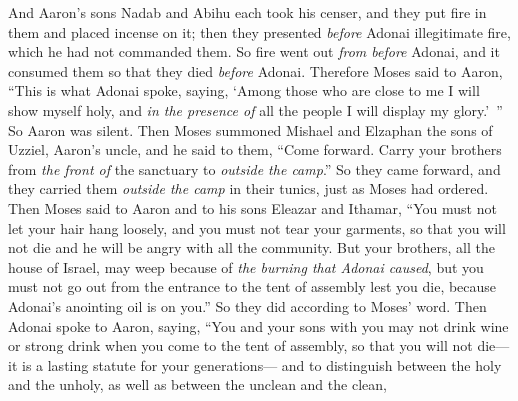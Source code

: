 \begin{biblechapter} %
 And Aaron’s sons Nadab and Abihu each took his censer, and they put fire in them and placed incense on it; then they presented \textit{before} Adonai illegitimate fire, which he had not commanded them.
\verse So fire went out \textit{from before} Adonai, and it consumed them so that they died \textit{before} Adonai.
\verse Therefore Moses said to Aaron, “This is what Adonai spoke, saying, ‘Among those who are close to me I will show myself holy, and \textit{in the presence of} all the people I will display my glory.’ ” So Aaron was silent.
\verse Then Moses summoned Mishael and Elzaphan the sons of Uzziel, Aaron’s uncle, and he said to them, “Come forward. Carry your brothers from \textit{the front of} the sanctuary to \textit{outside the camp}.”
\verse So they came forward, and they carried them \textit{outside the camp} in their tunics, just as Moses had ordered.
\verse Then Moses said to Aaron and to his sons Eleazar and Ithamar, “You must not let your hair hang loosely, and you must not tear your garments, so that you will not die and he will be angry with all the community. But your brothers, all the house of Israel, may weep because of \textit{the burning that Adonai caused},
\verse but you must not go out from the entrance to the tent of assembly lest you die, because Adonai’s anointing oil is on you.” So they did according to Moses’ word.
 Then Adonai spoke to Aaron, saying,
\verse “You and your sons with you may not drink wine or strong drink when you come to the tent of assembly, so that you will not die—it is a lasting statute for your generations—
\verse and to distinguish between the holy and the unholy, as well as between the unclean and the clean,

\end{biblechapter}
